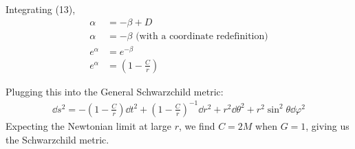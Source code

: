 \documentclass[12pt]{article}
\begin{document}
Integrating (13),
\begin{align}
  \alpha &= -\beta + D \nonumber\\
  \alpha &= -\beta \text{ (with a coordinate redefinition)} \nonumber \\
  e^\alpha &= e^{-\beta} \nonumber \\
  e^\alpha &= \left(1-\frac{C}{r}\right)
\end{align}

Plugging this into the General Schwarzchild metric:
\begin{align}
  \dd{s^2} = -\left(1-\frac{C}{r}\right)\dd{t^2} + \left(1-\frac{C}{r}\right)^{-1}\dd{r^2} + r^2\dd{\theta^2} + r^2\sin^2{\theta}\dd{\varphi^2}
\end{align}
Expecting the Newtonian limit at large $r$, we find $C = 2M$ when $G=1$, giving us the Schwarzchild metric.
\end{document}
